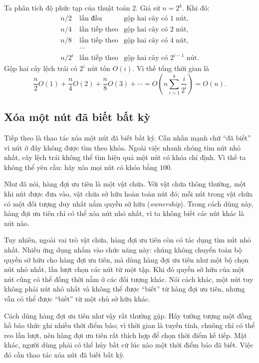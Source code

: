 \documentclass[11pt]{article}
\begin{document}
Ta phân tích độ phức tạp của thuật toán 2. Giả sử \(n=2^k\). Khi đó:
\[
\begin{array}{rcl}
n/2 & \text{lần đầu} & \text{gộp hai cây có 1 nút},\\
n/4 & \text{lần tiếp theo} & \text{gộp hai cây có 2 nút},\\
n/8 & \text{lần tiếp theo} & \text{gộp hai cây có 4 nút},\\
    & \cdots & \\
n/2^i & \text{lần tiếp theo} & \text{gộp hai cây có }2^{i-1}\text{ nút}.
\end{array}
\]
Gộp hai cây lệch trái có \(2^i\) nút tốn \(O(i)\). Vì thế tổng thời gian là
\[
  \frac n2O(1)+\frac n4O(2)+\frac n8O(3)+\cdots
  =
  O\!\left(n\sum_{i=1}^k \frac{i}{2^i}\right)
  =
  O(n).
\]

\subsection{Xóa một nút đã biết bất kỳ}

Tiếp theo là thao tác xóa một nút đã biết bất kỳ. Cần nhấn mạnh chữ ``đã biết''
vì nút ở đây không được tìm theo khóa. Ngoài việc nhanh chóng tìm nút nhỏ nhất,
cây lệch trái không thể tìm hiệu quả một nút có khóa chỉ định. Vì thế ta không
thể yêu cầu: hãy xóa mọi nút có khóa bằng \(100\).

Như đã nói, hàng đợi ưu tiên là một vật chứa. Với vật chứa thông thường, một khi
nút được đưa vào, vật chứa sở hữu hoàn toàn nút đó; mỗi nút trong vật chứa có
một đối tượng duy nhất nắm quyền sở hữu (\emph{ownership}). Trong cách dùng này,
hàng đợi ưu tiên chỉ có thể xóa nút nhỏ nhất, vì ta không biết các nút khác là
nút nào.

Tuy nhiên, ngoài vai trò vật chứa, hàng đợi ưu tiên còn có tác dụng tìm nút nhỏ
nhất. Nhiều ứng dụng nhắm vào chức năng này: chúng không chuyển toàn bộ quyền
sở hữu cho hàng đợi ưu tiên, mà dùng hàng đợi ưu tiên như một bộ chọn nút nhỏ
nhất, lần lượt chọn các nút từ một tập. Khi đó quyền sở hữu của một nút cũng có
thể đồng thời nằm ở các đối tượng khác. Nói cách khác, một nút tuy không phải
nút nhỏ nhất và không thể được ``biết'' từ hàng đợi ưu tiên, nhưng vẫn có thể
được ``biết'' từ một chủ sở hữu khác.

Cách dùng hàng đợi ưu tiên như vậy rất thường gặp. Hãy tưởng tượng một đồng hồ
báo thức ghi nhiều thời điểm báo; vì thời gian là tuyến tính, chuông chỉ có thể
reo lần lượt, nên hàng đợi ưu tiên rất thích hợp để chọn thời điểm kế tiếp. Mặt
khác, người dùng phải có thể hủy bất cứ lúc nào một thời điểm báo đã biết. Việc
đó cần thao tác xóa nút đã biết bất kỳ.
\end{document}
